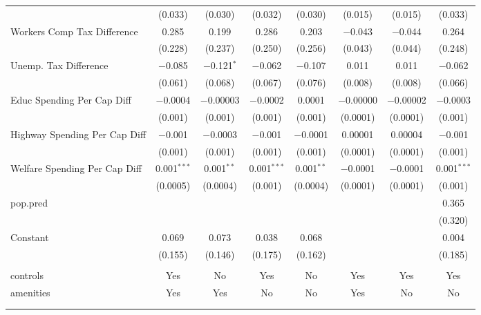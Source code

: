 \begin{table}[!htbp]
\begin{tabular}{@{\extracolsep{5pt}}lccccccc}
  & (0.033) & (0.030) & (0.032) & (0.030) & (0.015) & (0.015) & (0.033) \\ 
  Workers Comp Tax Difference & 0.285 & 0.199 & 0.286 & 0.203 & $-$0.043 & $-$0.044 & 0.264 \\ 
  & (0.228) & (0.237) & (0.250) & (0.256) & (0.043) & (0.044) & (0.248) \\ 
  Unemp. Tax Difference & $-$0.085 & $-$0.121$^{*}$ & $-$0.062 & $-$0.107 & 0.011 & 0.011 & $-$0.062 \\ 
  & (0.061) & (0.068) & (0.067) & (0.076) & (0.008) & (0.008) & (0.066) \\ 
  Educ Spending Per Cap Diff & $-$0.0004 & $-$0.00003 & $-$0.0002 & 0.0001 & $-$0.00000 & $-$0.00002 & $-$0.0003 \\ 
  & (0.001) & (0.001) & (0.001) & (0.001) & (0.0001) & (0.0001) & (0.001) \\ 
  Highway Spending Per Cap Diff & $-$0.001 & $-$0.0003 & $-$0.001 & $-$0.0001 & 0.00001 & 0.00004 & $-$0.001 \\ 
  & (0.001) & (0.001) & (0.001) & (0.001) & (0.0001) & (0.0001) & (0.001) \\ 
  Welfare Spending Per Cap Diff & 0.001$^{***}$ & 0.001$^{**}$ & 0.001$^{***}$ & 0.001$^{**}$ & $-$0.0001 & $-$0.0001 & 0.001$^{***}$ \\ 
  & (0.0005) & (0.0004) & (0.001) & (0.0004) & (0.0001) & (0.0001) & (0.001) \\ 
  pop.pred &  &  &  &  &  &  & 0.365 \\ 
  &  &  &  &  &  &  & (0.320) \\ 
  Constant & 0.069 & 0.073 & 0.038 & 0.068 &  &  & 0.004 \\ 
  & (0.155) & (0.146) & (0.175) & (0.162) &  &  & (0.185) \\ 
 \hline \\[-1.8ex] 
controls & Yes & No & Yes & No & Yes & Yes & Yes \\ 
amenities & Yes & Yes & No & No & Yes & No & No \\ 
\hline \\[-1.8ex] 
\hline 
\hline \\[-1.8ex] 
\end{tabular} 
\end{table} 
